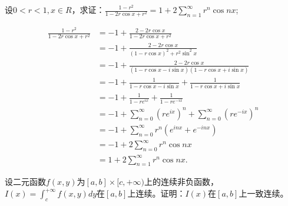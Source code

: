   \begin{exercise}
   设$0<r<1,x\in R$，求证：$\displaystyle\frac{1-r^2}{1-2r\cos x+r^2}=1+2\sum_{n=1}^{\infty}r^n\cos nx$;
  \end{exercise}

  \begin{solution}
\begin{align*}
\frac{1-r^2}{1-2r\cos x+r^2}&=-1+\frac{2-2r\cos x}{1-2r\cos x+r^2}\\
&=-1+\frac{2-2r\cos x}{(1-r\cos x)^2+r^2\sin^2x}\\
&=-1+\frac{2-2r\cos x}{(1-r\cos x-i\sin x)(1-r\cos x+i\sin x)}\\
&=-1+\frac{1}{1-r\cos x-i\sin x}+\frac{1}{1-r\cos x+i\sin x}\\
&=-1+\frac{1}{1-re^{ix}}+\frac{1}{1-re^{-ix}}\\
&=-1+\sum_{n=0}^{\infty}(re^{ix})^n+\sum_{n=0}^{\infty}(re^{-ix})^n\\
&=-1+\sum_{n=0}^{\infty}r^n(e^{inx}+e^{-inx})\\
&=-1+2\sum_{n=0}^{\infty}r^n\cos nx\\
&=1+2\sum_{n=1}^{\infty}r^n\cos nx.
\end{align*}
  \end{solution}

  \begin{exercise}
  设二元函数$f(x,y)$为$[a,b]\times[c,+\infty)$上的连续非负函数，$I(x)=\int_c^{+\infty}f(x,y)dy$在$[a,b]$上连续。证明：$I(x)$在$[a,b]$上一致连续。
\end{exercise}

